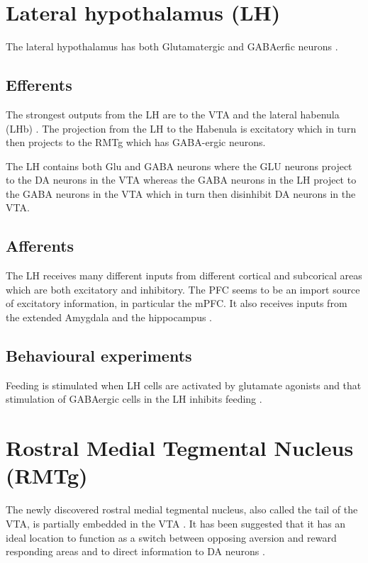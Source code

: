 \documentclass[12pt,a4paper]{article}
\begin{document}
\section{Lateral hypothalamus (LH)}

The lateral hypothalamus has both Glutamatergic and GABAerfic neurons \citep{Stanley2011}.

\subsection{Efferents}

The strongest outputs from the LH are to the VTA and the lateral habenula (LHb) \citep{Stuber2016}. 
The projection from the LH to the Habenula is excitatory \citep{Poller2013} which in turn then projects to the RMTg which has GABA-ergic neurons.

The LH contains both Glu and GABA neurons where the GLU neurons project to the DA neurons in the VTA whereas the GABA neurons in the LH project to the GABA neurons in the VTA which in turn then disinhibit DA neurons in the VTA. 


\subsection{Afferents}

The LH receives many different inputs from different cortical and subcorical areas which are both excitatory and inhibitory. The PFC seems to be an import source of excitatory information, in particular the mPFC. It also receives inputs from the extended Amygdala and the hippocampus \citep{Stuber2016}.

\subsection{Behavioural experiments}

Feeding is stimulated when LH cells are activated by glutamate
agonists \citep{stanley93} and that stimulation of GABAergic cells in the LH inhibits feeding \citep{Stanley2011}.






\section{Rostral Medial Tegmental Nucleus (RMTg) }

The newly discovered rostral medial tegmental nucleus, also called the tail of
the VTA, is partially embedded in the VTA \citep{Bourdy2012}. It has been suggested that it has
an ideal location to function as a switch between opposing aversion and reward
responding areas and to direct information to DA neurons \citep{Barrot2012}.
\end{document}
